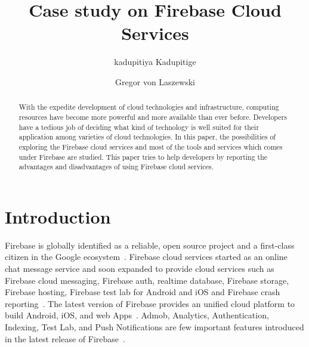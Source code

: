 \title{Case study on Firebase Cloud Services}


\author{kadupitiya Kadupitige}

\author{Gregor von Laszewski}


\renewcommand{\shortauthors}{G. v. Laszewski}


\begin{abstract}
	With the expedite development of cloud technologies and infrastructure, 
	computing resources have become more powerful and more available than ever 
	before. Developers have a tedious job of deciding what kind of technology 
	is 
	well suited for their application among varieties of cloud technologies. In 
	this paper, the possibilities of exploring the Firebase cloud services and 
	most 
	of the tools and services which comes under Firebase are studied. This 
	paper 
	tries to help developers by reporting the advantages and disadvantages of 
	using 
	Firebase cloud services.
\end{abstract}



\maketitle


\section{Introduction}

Firebase is globally identified as a reliable, open source project and a 
first-class citizen in the Google ecosystem~\cite{hid-sp18-409-www-firebase}. 
Firebase cloud services started as an online chat message service and soon 
expanded to provide cloud services such as Firebase cloud messaging, Firebase 
auth, realtime database, Firebase storage, Firebase hosting, Firebase test lab 
for Android and iOS and Firebase crash 
reporting~\cite{hid-sp18-409-www-firebase-official}. The latest version of 
Firebase provides an unified cloud platform to build Android, iOS, and web 
Apps~\cite{hid-sp18-409-www-firebase-official}.  Admob, Analytics, 
Authentication, Indexing, Test Lab, and Push Notifications are few important 
features introduced in the latest release of 
Firebase~\cite{hid-sp18-409-www-firebase-official}. 

